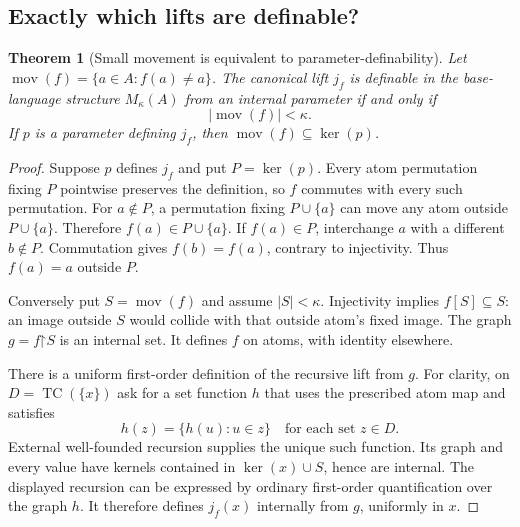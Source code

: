 \documentclass[11pt,letterpaper]{article}
\numberwithin{equation}{section}
\theoremstyle{plain}
\newtheorem{theorem}{Theorem}[section]
\theoremstyle{definition}
\theoremstyle{remark}
\newcommand{\kerat}{\operatorname{ker}}
\newcommand{\TC}{\operatorname{TC}}
\newcommand{\supp}{\operatorname{mov}}
\begin{document}
\subsection{Exactly which lifts are definable?}
\begin{theorem}[Small movement is equivalent to parameter-definability]\label{nee:thm:definable}
Let $\supp(f)=\{a\in A:f(a)\neq a\}$. The canonical lift $j_f$ is definable in the base-language structure $M_\kappa(A)$ from an internal parameter if and only if
\begin{equation}\label{nee:eq:defcrit}
|\supp(f)|<\kappa.
\end{equation}
If $p$ is a parameter defining $j_f$, then $\supp(f)\subseteq\kerat(p)$.
\end{theorem}
\begin{proof}
Suppose $p$ defines $j_f$ and put $P=\kerat(p)$. Every atom permutation fixing $P$ pointwise preserves the definition, so $f$ commutes with every such permutation. For $a\notin P$, a permutation fixing $P\cup\{a\}$ can move any atom outside $P\cup\{a\}$. Therefore $f(a)\in P\cup\{a\}$. If $f(a)\in P$, interchange $a$ with a different $b\notin P$. Commutation gives $f(b)=f(a)$, contrary to injectivity. Thus $f(a)=a$ outside $P$.

Conversely put $S=\supp(f)$ and assume $|S|<\kappa$. Injectivity implies $f[S]\subseteq S$: an image outside $S$ would collide with that outside atom's fixed image. The graph $g=f\mathord{\upharpoonright}S$ is an internal set. It defines $f$ on atoms, with identity elsewhere.

There is a uniform first-order definition of the recursive lift from $g$. For clarity, on $D=\TC(\{x\})$ ask for a set function $h$ that uses the prescribed atom map and satisfies
\[
h(z)=\{h(u):u\in z\}\quad\text{for each set }z\in D.
\]
External well-founded recursion supplies the unique such function. Its graph and every value have kernels contained in $\kerat(x)\cup S$, hence are internal. The displayed recursion can be expressed by ordinary first-order quantification over the graph $h$. It therefore defines $j_f(x)$ internally from $g$, uniformly in $x$.
\end{proof}
\end{document}
